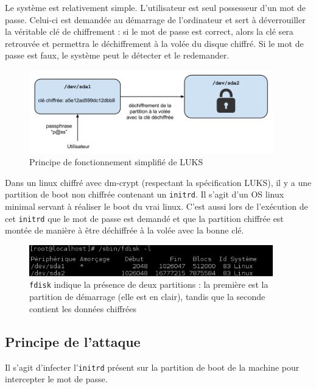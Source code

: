 \documentclass[12pt,a4paper]{article}
\begin{document}
Le système est relativement simple. L'utilisateur est seul possesseur d'un mot de passe. Celui-ci est demandée au démarrage de l'ordinateur et sert à déverrouiller la véritable clé de chiffrement : si le mot de passe est correct, alors la clé sera retrouvée et permettra le déchiffrement à la volée du disque chiffré. Si le mot de passe est faux, le système peut le détecter et le redemander.

\begin{figure}[H]
	\centering
	\includegraphics[width=400px]{img/luks_principe.png}
	\caption{Principe de fonctionnement simplifié de LUKS}
\end{figure}

Dans un linux chiffré avec dm-crypt (respectant la spécification LUKS), il y a une partition de boot non chiffrée contenant un \texttt{initrd}. Il s'agit d'un OS linux minimal servant à réaliser le boot du vrai linux. C'est aussi lors de l'exécution de cet \texttt{initrd} que le mot de passe est demandé et que la partition chiffrée est montée de manière à être déchiffrée à la volée avec la bonne clé.

\begin{figure}[H]
	\centering
	\includegraphics[width=400px]{img/luks_fdisk.png}
	\caption{\texttt{fdisk} indique la présence de deux partitions : la première est la partition de démarrage (elle est en clair), tandis que la seconde contient les données chiffrées}
\end{figure}

\subsection{Principe de l'attaque}

Il s'agit d'infecter l'\texttt{initrd} présent sur la partition de boot de la
machine pour intercepter le mot de passe.
\end{document}
